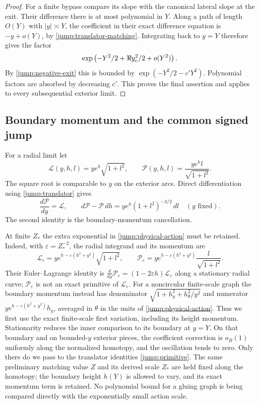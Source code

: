 \begin{proof}
For a finite bypass compare its slope with the canonical lateral
slope at the exit.  Their difference there is at most polynomial
in $Y$.  Along a path of length $O(Y)$ with $|y|\asymp Y$, the
coefficient in their exact difference equation is
$-y+o(Y)$, by \eqref{jump:translator-matching}.  Integrating
back to $y=Y$ therefore gives the factor
\[
 \exp\left(-Y^2/2+\Re y_{\rm e}^{2}/2+o(Y^2)\right).
\]
By \eqref{jump:negative-exit} this is bounded by
$\exp(-Y^2/2-c'Y^2)$.  Polynomial factors are absorbed by
decreasing $c'$.  This proves the final assertion and applies to
every subsequential exterior limit.
\end{proof}

\subsection{Boundary momentum and the common signed jump}

For a radial limit let
\begin{equation}\label{jump:lagrangian}
 \mathcal L(y,h,l)=y e^h\sqrt{1+l^2},
 \qquad \mathcal P(y,h,l)=\frac{ye^h l}{\sqrt{1+l^2}}.
\end{equation}
The square root is comparable to $y$ on the exterior arcs.
Direct differentiation using \eqref{jump:translator} gives
\begin{equation}\label{jump:primitive}
 \frac{d\mathcal P}{dy}=\mathcal L,
 \qquad
 d\mathcal P-\mathcal P\,dh
       =ye^h(1+l^2)^{-3/2}\,dl\quad(y\text{ fixed}).
\end{equation}
The second identity is the boundary-momentum cancellation.

At finite $Z_*$ the extra exponential in
\eqref{jump:physical-action} must be retained.  Indeed, with
$\varepsilon=Z_*^{-2}$, the radial integrand and its momentum are
\[
 \mathcal L_\varepsilon
 =ye^{h-\varepsilon(h^2+y^2)}\sqrt{1+l^2},\qquad
 \mathcal P_\varepsilon
 =ye^{h-\varepsilon(h^2+y^2)}\frac l{\sqrt{1+l^2}}.
\]
Their Euler--Lagrange identity is
$\frac{d}{dy}\mathcal P_\varepsilon
 =(1-2\varepsilon h)\mathcal L_\varepsilon$ along a stationary
radial curve; $\mathcal P_\varepsilon$ is not an exact primitive
of $\mathcal L_\varepsilon$.
For a noncircular finite-scale graph the boundary momentum instead
has denominator $\sqrt{1+h_y^2+h_\theta^2/y^2}$ and numerator
$ye^{h-\varepsilon(h^2+y^2)}h_y$, averaged in $\theta$ in the
units of \eqref{jump:physical-action}.
Thus we first use the exact finite-scale first variation, including
its height momentum.  Stationarity reduces the inner comparison to
its boundary at $y=Y$.  On that boundary and on bounded-$y$
exterior pieces, the coefficient correction is $o_B(1)$ uniformly
along the normalized homotopy, and the oscillation tends to zero.
Only there do we pass to the translator identities
\eqref{jump:primitive}.  The same preliminary matching value $Z$
and its derived scale $Z_*$ are held fixed along the homotopy;
the boundary height $h(Y)$ is allowed to vary, and its exact
momentum term is retained.  No polynomial bound for a gluing
graph is being compared directly with the exponentially small
action scale.

